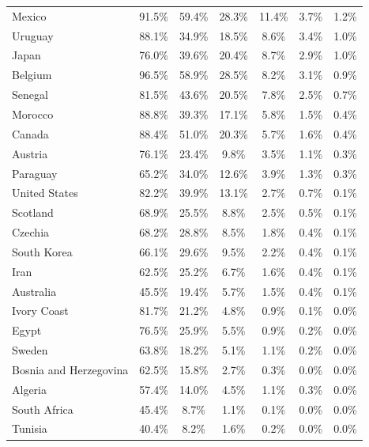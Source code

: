 \documentclass[11pt,letterpaper]{article}
\begin{document}
\begin{table}[p]
\begin{small}
\begin{threeparttable}
{\begin{tabular*}{\textwidth}{@{\extracolsep{\fill}} lcccccc}
Mexico                 & 91.5\% & 59.4\% & 28.3\% & 11.4\% &  3.7\% &  1.2\% \\
Uruguay                & 88.1\% & 34.9\% & 18.5\% &  8.6\% &  3.4\% &  1.0\% \\
Japan                  & 76.0\% & 39.6\% & 20.4\% &  8.7\% &  2.9\% &  1.0\% \\
Belgium                & 96.5\% & 58.9\% & 28.5\% &  8.2\% &  3.1\% &  0.9\% \\
Senegal                & 81.5\% & 43.6\% & 20.5\% &  7.8\% &  2.5\% &  0.7\% \\
Morocco                & 88.8\% & 39.3\% & 17.1\% &  5.8\% &  1.5\% &  0.4\% \\
Canada                 & 88.4\% & 51.0\% & 20.3\% &  5.7\% &  1.6\% &  0.4\% \\
Austria                & 76.1\% & 23.4\% &  9.8\% &  3.5\% &  1.1\% &  0.3\% \\
Paraguay               & 65.2\% & 34.0\% & 12.6\% &  3.9\% &  1.3\% &  0.3\% \\
United States          & 82.2\% & 39.9\% & 13.1\% &  2.7\% &  0.7\% &  0.1\% \\
Scotland               & 68.9\% & 25.5\% &  8.8\% &  2.5\% &  0.5\% &  0.1\% \\
Czechia                & 68.2\% & 28.8\% &  8.5\% &  1.8\% &  0.4\% &  0.1\% \\
South Korea            & 66.1\% & 29.6\% &  9.5\% &  2.2\% &  0.4\% &  0.1\% \\
Iran                   & 62.5\% & 25.2\% &  6.7\% &  1.6\% &  0.4\% &  0.1\% \\
Australia              & 45.5\% & 19.4\% &  5.7\% &  1.5\% &  0.4\% &  0.1\% \\
Ivory Coast            & 81.7\% & 21.2\% &  4.8\% &  0.9\% &  0.1\% &  0.0\% \\
Egypt                  & 76.5\% & 25.9\% &  5.5\% &  0.9\% &  0.2\% &  0.0\% \\
Sweden                 & 63.8\% & 18.2\% &  5.1\% &  1.1\% &  0.2\% &  0.0\% \\
Bosnia and Herzegovina & 62.5\% & 15.8\% &  2.7\% &  0.3\% &  0.0\% &  0.0\% \\
Algeria                & 57.4\% & 14.0\% &  4.5\% &  1.1\% &  0.3\% &  0.0\% \\
South Africa           & 45.4\% &  8.7\% &  1.1\% &  0.1\% &  0.0\% &  0.0\% \\
Tunisia                & 40.4\% &  8.2\% &  1.6\% &  0.2\% &  0.0\% &  0.0\% \\

\end{tabular*}}
\end{threeparttable}
\end{small}
\end{table}
\end{document}
